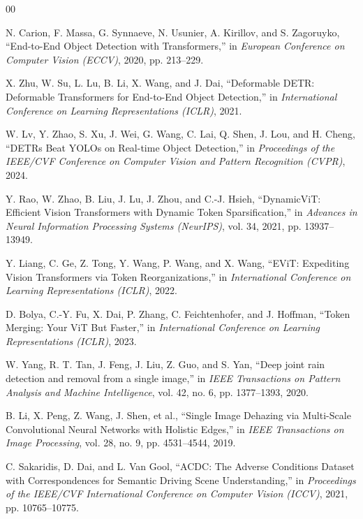 \documentclass[conference]{IEEEtran}
\begin{document}
\begin{thebibliography}{00}

 N. Carion, F. Massa, G. Synnaeve, N. Usunier, A. Kirillov, and S. Zagoruyko, ``End-to-End Object Detection with Transformers,'' in \textit{European Conference on Computer Vision (ECCV)}, 2020, pp. 213--229.

 X. Zhu, W. Su, L. Lu, B. Li, X. Wang, and J. Dai, ``Deformable DETR: Deformable Transformers for End-to-End Object Detection,'' in \textit{International Conference on Learning Representations (ICLR)}, 2021.

 W. Lv, Y. Zhao, S. Xu, J. Wei, G. Wang, C. Lai, Q. Shen, J. Lou, and H. Cheng, ``DETRs Beat YOLOs on Real-time Object Detection,'' in \textit{Proceedings of the IEEE/CVF Conference on Computer Vision and Pattern Recognition (CVPR)}, 2024.

 Y. Rao, W. Zhao, B. Liu, J. Lu, J. Zhou, and C.-J. Hsieh, ``DynamicViT: Efficient Vision Transformers with Dynamic Token Sparsification,'' in \textit{Advances in Neural Information Processing Systems (NeurIPS)}, vol. 34, 2021, pp. 13937--13949.

 Y. Liang, C. Ge, Z. Tong, Y. Wang, P. Wang, and X. Wang, ``EViT: Expediting Vision Transformers via Token Reorganizations,'' in \textit{International Conference on Learning Representations (ICLR)}, 2022.

 D. Bolya, C.-Y. Fu, X. Dai, P. Zhang, C. Feichtenhofer, and J. Hoffman, ``Token Merging: Your ViT But Faster,'' in \textit{International Conference on Learning Representations (ICLR)}, 2023.

 W. Yang, R. T. Tan, J. Feng, J. Liu, Z. Guo, and S. Yan, ``Deep joint rain detection and removal from a single image,'' in \textit{IEEE Transactions on Pattern Analysis and Machine Intelligence}, vol. 42, no. 6, pp. 1377--1393, 2020.

 B. Li, X. Peng, Z. Wang, J. Shen, et al., ``Single Image Dehazing via Multi-Scale Convolutional Neural Networks with Holistic Edges,'' in \textit{IEEE Transactions on Image Processing}, vol. 28, no. 9, pp. 4531--4544, 2019.

 C. Sakaridis, D. Dai, and L. Van Gool, ``ACDC: The Adverse Conditions Dataset with Correspondences for Semantic Driving Scene Understanding,'' in \textit{Proceedings of the IEEE/CVF International Conference on Computer Vision (ICCV)}, 2021, pp. 10765--10775.


\end{thebibliography}
\end{document}
